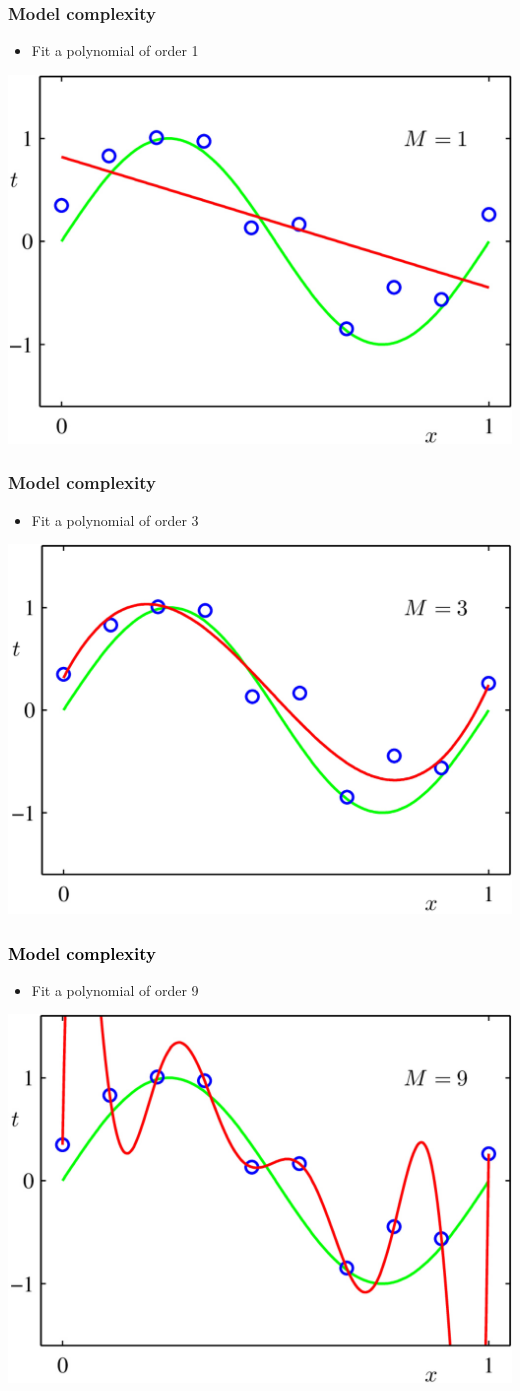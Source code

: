 \documentclass[12pt,notes,mathserif]{beamer}
\begin{document}
\begin{frame}[c]
	\frametitle{Model complexity}
	\begin{itemize}
		\item Fit a polynomial of order 1
	\end{itemize}
	\begin{center}
		\includegraphics[width=0.61\linewidth]{fig/lec54.jpg}
	\end{center}
\end{frame}
\begin{frame}[c]
	\frametitle{Model complexity}
	\begin{itemize}
		\item Fit a polynomial of order 3
	\end{itemize}
	\begin{center}
		\includegraphics[width=0.61\linewidth]{fig/lec55.jpg}
	\end{center}
\end{frame}
\begin{frame}[c]
	\frametitle{\textcolor{black}{Model complexity}}
	\begin{itemize}
		\item Fit a polynomial of order 9
	\end{itemize}
	\begin{center}
		\includegraphics[width=0.61\linewidth]{fig/lec56.jpg}
	\end{center}
\end{frame}
\end{document}
